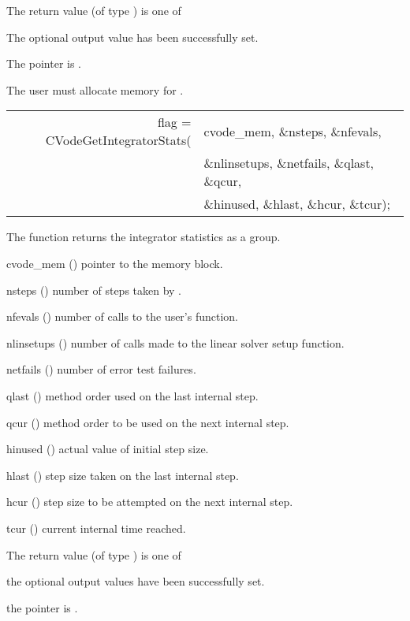 {
  The return value  (of type ) is one of
  \begin{args}
  \item[\Id{CV\_SUCCESS}] 
    The optional output value has been successfully set.
  \item[\Id{CV\_MEM\_NULL}]
    The  pointer is .
  \end{args}
}
{
  {\warn} The user must allocate memory for .
}
{
  \begin{tabular}[t]{@{}r@{}l@{}}
    flag = CVodeGetIntegratorStats(&cvode\_mem, \&nsteps, \&nfevals, \\
                                   &\&nlinsetups, \&netfails, \&qlast, \&qcur, \\
                                   &\&hinused, \&hlast, \&hcur, \&tcur);
  \end{tabular}
}
{
  The function  returns the {\cvodes} integrator
  statistics as a group.
}
{
  \begin{args}[nlinsetups]
  \item[cvode\_mem] ()
    pointer to the {\cvodes} memory block.
  \item[nsteps] ()
    number of steps taken by {\cvodes}.
  \item[nfevals] ()
    number of calls to the user's  function.
  \item[nlinsetups] ()
    number of calls made to the linear solver setup function.
  \item[netfails] ()
    number of error test failures.
  \item[qlast] ()
    method order used on the last internal step.
  \item[qcur] ()
    method order to be used on the next internal step.
  \item[hinused] ()
    actual value of initial step size.
  \item[hlast] ()
    step size taken on the last internal step.
  \item[hcur] ()
    step size to be attempted on the next internal step.
  \item[tcur] ()
    current internal time reached.
  \end{args}
}
{
  The return value  (of type ) is one of
  \begin{args}
  \item[\Id{CV\_SUCCESS}] 
    the optional output values have been successfully set.
  \item[\Id{CV\_MEM\_NULL}]
    the  pointer is .
  \end{args}
}
